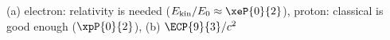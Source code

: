 (a) electron: relativity is needed ($E_\mathrm{kin}/E_0 \approx \xeP{0}{2}$), proton: classical is good enough ($\xpP{0}{2}$), (b) $\ECP{9}{3}/c^2$
